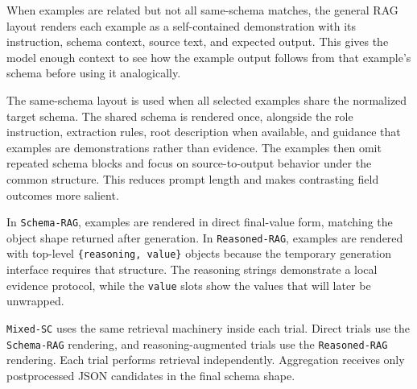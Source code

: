 When examples are related but not all same-schema matches, the general RAG layout renders each example as a self-contained demonstration with its instruction, schema context, source text, and expected output. This gives the model enough context to see how the example output follows from that example's schema before using it analogically.

The same-schema layout is used when all selected examples share the normalized target schema. The shared schema is rendered once, alongside the role instruction, extraction rules, root description when available, and guidance that examples are demonstrations rather than evidence. The examples then omit repeated schema blocks and focus on source-to-output behavior under the common structure. This reduces prompt length and makes contrasting field outcomes more salient.

In \texttt{Schema-RAG}, examples are rendered in direct final-value form, matching the object shape returned after generation. In \texttt{Reasoned-RAG}, examples are rendered with top-level \texttt{\{reasoning, value\}} objects because the temporary generation interface requires that structure. The reasoning strings demonstrate a local evidence protocol, while the \texttt{value} slots show the values that will later be unwrapped.

\texttt{Mixed-SC} uses the same retrieval machinery inside each trial. Direct trials use the \texttt{Schema-RAG} rendering, and reasoning-augmented trials use the \texttt{Reasoned-RAG} rendering. Each trial performs retrieval independently. Aggregation receives only postprocessed JSON candidates in the final schema shape.

